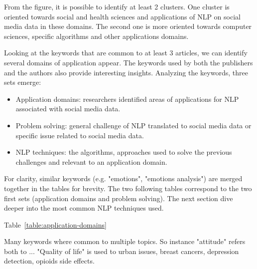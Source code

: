 From the figure, it is possible to identify at least 2 clusters.
One cluster is oriented towards social and health sciences and applications of NLP on social media data in these domains.
The second one is more oriented towards computer sciences, specific algorithms and other applications domains.

Looking at the keywords that are common to at least 3 articles, we can identify several domains of application appear.
The keywords used by both the publishers and the authors also provide interesting insights.
Analyzing the keywords, three sets emerge:
\begin{itemize}
    \item Application domains: researchers identified areas of applications for NLP associated with social media data.
    \item Problem solving: general challenge of NLP translated to social media data or specific issue related to social media data.
    \item NLP techniques: the algorithms, approaches used to solve the previous challenges and relevant to an application domain.
\end{itemize}
For clarity, similar keywords (e.g. "emotions", "emotions analysis") are merged together in the tables for brevity.
The two following tables correspond to the two first sets (application domains and problem solving).
The next section dive deeper into the most common NLP techniques used.

Table~\ref{table:application-domains}

Many keywords where common to multiple topics. So instance "attitude" refers both to ...
"Quality of life" is used to urban issues, breast cancers, depression detection, opioids side effects.

